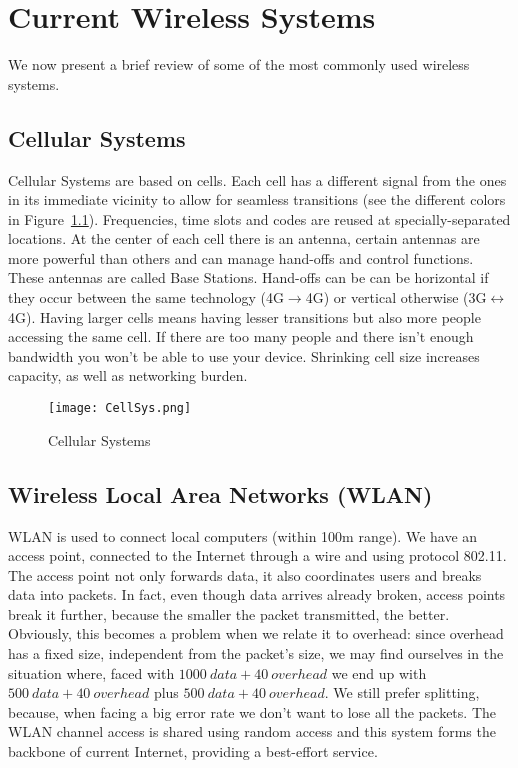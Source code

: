 \chapter{Current Wireless Systems}
We now present a brief review of some of the most commonly used wireless 
systems.

\section{Cellular Systems}
Cellular Systems are based on cells. Each cell has a different signal 
from the ones in its immediate vicinity to allow for seamless transitions (see 
the different colors in Figure~\ref{fig:cws:CellSys}). Frequencies, time 
slots and codes are reused at specially-separated locations. At the center of 
each cell there is an antenna, certain antennas are more powerful than others 
and can manage hand-offs and control functions. These antennas are called Base 
Stations. Hand-offs can be can be horizontal if they occur between the same 
technology (4G$\to$4G) or vertical otherwise 
(3G$\leftrightarrow$4G).
Having larger cells means having lesser transitions but also more people 
accessing the same cell. If there are too many people and there isn't enough 
bandwidth you won't be able to use your device. Shrinking cell size increases 
capacity, as well as networking burden.
\begin{figure}[!h]
  \centering
  \texttt{[image: CellSys.png]}
  \caption{Cellular Systems}				
  \label{fig:cws:CellSys}
\end{figure}

\section{Wireless Local Area Networks (WLAN)}
WLAN is used to connect local computers (within 100m range). We have an 
access point, connected to the Internet through a wire and using protocol 
802.11. The access point not only forwards data, it also coordinates users and 
breaks data into packets. In fact, even though data arrives already broken, 
access points break it further, because the smaller the packet transmitted, the 
better. Obviously, this becomes a problem when we relate it to overhead: since 
overhead has a fixed size, independent from the packet's size, we may find 
ourselves in the situation where, faced with $1000\ data + 40\ overhead$ we end
up with $500\ data + 40\ overhead$ plus $500\ data + 40\ overhead$.
We still prefer splitting, because, when facing a big error rate we 
don't want to lose all the packets.
The WLAN channel access is shared using random access and this system 
forms the backbone of current Internet, providing a best-effort service.

